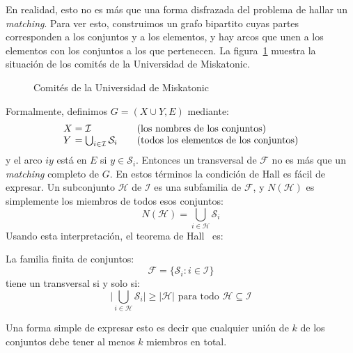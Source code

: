   En realidad,
  esto no es más que una forma disfrazada del problema
  de hallar un \emph{\foreignlanguage{english}{matching}}.
  Para ver esto,
  construimos un grafo bipartito
  cuyas partes corresponden a los conjuntos
  y a los elementos,
  y hay arcos que unen a los elementos
  con los conjuntos a los que pertenecen.
  La figura~\ref{fig:comites}
  muestra la situación
  de los comités de la Universidad de Miskatonic.
  \begin{figure}[htbp]
    \centering
    \caption{Comités de la Universidad de Miskatonic}
    \label{fig:comites}
  \end{figure}

  Formalmente,
  definimos \(G = (X \cup Y, E)\) mediante:
  \begin{equation*}
    \begin{array}{l@{{}={}}l@{\qquad}l}
       X & \mathcal{I}
	     & \text{(los nombres de los conjuntos)} \\
       Y & \bigcup_{i \in \mathcal{I}} \mathcal{S}_i
	     & \text{(todos los elementos de los conjuntos)}
    \end{array}	 \end{equation*}
  y el arco \(i y\) está en \(E\) si \(y \in \mathcal{S}_i\).
  Entonces un transversal de \(\mathcal{F}\)
  no es más que
  un \emph{\foreignlanguage{english}{matching}} completo de \(G\).
  En estos términos la condición de Hall es fácil de expresar.
  Un subconjunto \(\mathcal{H}\) de \(\mathcal{I}\)
  es una subfamilia de \(\mathcal{F}\),
  y \(N(\mathcal{H})\)
  es simplemente los miembros de todos esos conjuntos:
  \begin{equation*}
    N(\mathcal{H}) = \bigcup_{i \in \mathcal{H}} \mathcal{S}_i
  \end{equation*}
  Usando esta interpretación,
  el teorema de Hall~%
    \cite{hall35:_repres_subset}
  es:
  \begin{theorem}
    La familia finita de conjuntos:
    \begin{equation*}
      \mathcal{F} = \{\mathcal{S}_i \colon i \in \mathcal{I}\}
    \end{equation*}
    tiene un transversal si y solo si:
    \begin{equation*}
      \biggl| \bigcup_{i \in \mathcal{H}} \mathcal{S}_i \biggr|
	\ge \bigl| \mathcal{H} \bigr|
	  \text{\ para todo\ } \mathcal{H} \subseteq \mathcal{I}
    \end{equation*}
  \end{theorem}
  Una forma simple de expresar esto es decir
  que cualquier unión de \(k\) de los conjuntos
  debe tener al menos \(k\) miembros en total.

